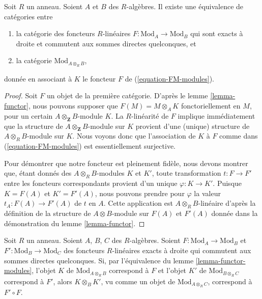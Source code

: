\begin{lemma}
\label{lemma-functor-modules}
Soit $R$ un anneau. Soient $A$ et $B$ des $R$-algèbres. Il existe une
équivalence de catégories entre
\begin{enumerate}
\item la catégorie des foncteurs $R$-linéaires
$F : \text{Mod}_A \to \text{Mod}_B$ qui
sont exacts à droite et commutent aux sommes directes quelconques, et
\item la catégorie $\text{Mod}_{A \otimes_R B}$,
\end{enumerate}
donnée en associant à $K$ le foncteur $F$ de (\ref{equation-FM-modules}).
\end{lemma}

\begin{proof}
Soit $F$ un objet de la première catégorie. D'après le
lemme \ref{lemma-functor}, nous pouvons supposer que $F(M) = M \otimes_A K$
fonctoriellement en $M$, pour un certain $A \otimes_\mathbf{Z} B$-module $K$.
La $R$-linéarité de $F$ implique immédiatement que la structure de
$A \otimes_\mathbf{Z} B$-module sur $K$ provient
d'une (unique) structure de $A \otimes_R B$-module sur $K$.
Nous voyons donc que l'association de $K$ à $F$ comme dans (\ref{equation-FM-modules})
est essentiellement surjective.

\medskip\noindent
Pour démontrer que notre foncteur est pleinement fidèle, nous devons montrer que,
étant donnés des $A \otimes_R B$-modules $K$ et $K'$, toute transformation
$t : F \to F'$ entre les foncteurs correspondants provient
d'un unique $\varphi : K \to K'$. Puisque $K = F(A)$ et $K' = F'(A)$,
nous pouvons prendre pour $\varphi$ la valeur $t_A : F(A) \to F'(A)$
de $t$ en $A$. Cette application est $A \otimes_R B$-linéaire d'après la
définition de la structure de $A \otimes B$-module sur $F(A)$
et $F'(A)$ donnée dans la démonstration du lemme \ref{lemma-functor}.
\end{proof}

\begin{remark}
\label{remark-composition}
Soit $R$ un anneau. Soient $A$, $B$, $C$ des $R$-algèbres.
Soient $F : \text{Mod}_A \to \text{Mod}_B$ et
$F' : \text{Mod}_B \to \text{Mod}_C$ des foncteurs
$R$-linéaires exacts à droite qui commutent aux sommes directes quelconques.
Si, par l'équivalence du lemme \ref{lemma-functor-modules}, l'objet
$K$ de $\text{Mod}_{A \otimes_R B}$ correspond à $F$ et l'objet
$K'$ de $\text{Mod}_{B \otimes_R C}$ correspond à $F'$, alors
$K \otimes_B K'$, vu comme un objet de
$\text{Mod}_{A \otimes_R C}$, correspond à $F' \circ F$.
\end{remark}

